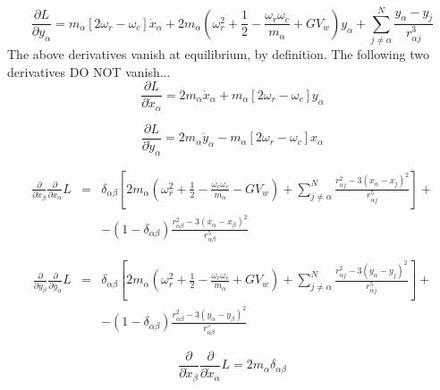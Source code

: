\documentclass[12pt]{article}
\begin{document}
\begin{equation}
\frac{\partial L}{\partial y_{\alpha}} = m_{\alpha}\left[2\omega_r-\omega_c\right]\dot{x}_{\alpha} + 2m_{\alpha} \left(\omega^2_r +\frac{1}{2} - \frac{\omega_r \omega_c}{m_{\alpha}} + G V_w \right) y_{\alpha} + \sum^N_{j \neq \alpha}\frac{y_{\alpha}-y_j}{r^3_{\alpha j}}
\end{equation}
The above derivatives vanish at equilibrium, by definition. The following two derivatives DO NOT vanish...
\begin{equation}
\frac{\partial L}{\partial \dot{x}_{\alpha}} = 2m_{\alpha}\dot{x}_{\alpha} + m_{\alpha}\left[2\omega_r - \omega_c\right]y_{\alpha}
\end{equation}

\begin{equation}
\frac{\partial L}{\partial \dot{y}_{\alpha}} = 2m_{\alpha}\dot{y}_{\alpha} - m_{\alpha}\left[2\omega_r - \omega_c\right]x_{\alpha}
\end{equation}


\begin{eqnarray}
\frac{\partial }{\partial x_{\beta}} \frac{\partial }{\partial x_{\alpha}} L &=& 
\delta_{\alpha \beta} \left[  2m_{\alpha} \left(\omega^2_r +\frac{1}{2} - \frac{\omega_r \omega_c}{m_{\alpha}} - G V_w \right) +\sum^N_{j \neq \alpha}\frac{r^2_{\alpha j} -3\left(x_{\alpha}-x_j \right)^2}{r^5_{\alpha j}} \right] + \nonumber \\
&& - \left(1- \delta_{\alpha \beta} \right) \frac{r^2_{\alpha \beta} -3\left(x_{\alpha}-x_{\beta} \right)^2}{r^5_{\alpha \beta}}
\end{eqnarray}

\begin{eqnarray}
\frac{\partial }{\partial y_{\beta}} \frac{\partial }{\partial y_{\alpha}} L &=& 
\delta_{\alpha \beta} \left[  2m_{\alpha} \left(\omega^2_r +\frac{1}{2} - \frac{\omega_r \omega_c}{m_{\alpha}} + G V_w \right) + \sum^N_{j \neq \alpha}\frac{r^2_{\alpha j} -3\left(y_{\alpha}-y_j \right)^2}{r^5_{\alpha j}} \right] + \nonumber \\
&& - \left(1- \delta_{\alpha \beta} \right) \frac{r^2_{\alpha \beta} -3\left(y_{\alpha}-y_{\beta} \right)^2}{r^5_{\alpha \beta}}
\end{eqnarray}

\begin{equation}
\frac{\partial }{\partial \dot{x}_{\beta}} \frac{\partial }{\partial \dot{x}_{\alpha}} L = 2m_{\alpha}\delta_{\alpha \beta} 
\end{equation}
\end{document}
